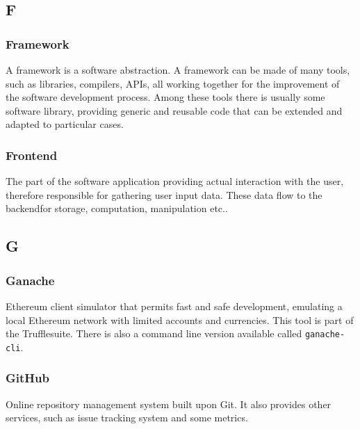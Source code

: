 

\subsection*{F}

\subsubsection*{Framework}
A framework is a software abstraction. A framework can be made of many tools, such as libraries, compilers, APIs\glo, all working together for the improvement of the software development process. Among these tools there is usually some software library, providing generic and reusable code that can be extended and adapted to particular cases.

\subsubsection*{Frontend}
The part of the software application providing actual interaction with the user, therefore responsible for gathering user input data. These data flow to the backend\glosp for storage, computation, manipulation etc..


\subsection*{G}

\subsubsection*{Ganache}
Ethereum client simulator that permits fast and safe development, emulating a local Ethereum network with limited accounts and currencies. This tool is part of the Truffle\glosp suite. There is also a command line version available called \texttt{ganache-cli}.

\subsubsection*{GitHub}
Online repository management system built upon Git. It also provides other services, such as issue tracking system and some metrics.

